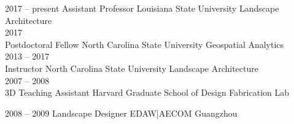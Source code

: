 \documentclass[10pt]{developercv} %
\begin{document}
\vspace*{-0.3cm}

\begin{entrylist}
	\entry
		{2017 -- present}
		{Assistant Professor}
		{Louisiana State University}
		{Landscape Architecture\\
		}
	\entry
		{2017\\\footnotesize{}}
		{Postdoctoral Fellow}
		{North Carolina State University}
		{Geospatial Analytics\\
		}
	\entry
		{2013 -- 2017\\\footnotesize{}}
		{Instructor}
		{North Carolina State University}
		{Landscape Architecture\\
		}
	\entry
		{2007 -- 2008\\\footnotesize{}}
		{3D Teaching Assistant}
		{Harvard Graduate School of Design}
		{Fabrication Lab\\
		}
\end{entrylist}


\vspace*{-0.4cm}

\begin{entrylist}
	\entry
		{2008 -- 2009}
		{Landscape Designer}
		{EDAW|AECOM Guangzhou}
		{%
		}
\end{entrylist}



\nocite{*}
\setlength\bibitemsep{0.75em}

\printbibliography[title={\cvsect{Books}}, type=book, heading=subbibliography]

\printbibliography[title={\cvsect{Papers}}, keyword=peer_reviewed, heading=subbibliography]

\clearpage

\printbibliography[title={\cvsect{Chapters}}, type=incollection, heading=subbibliography]
\end{document}
